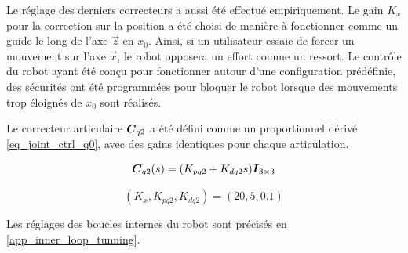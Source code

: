 

Le réglage des derniers correcteurs a aussi été effectué empiriquement. Le gain $K_x$ pour la correction sur la position a été choisi de manière à fonctionner comme un guide le long de l'axe $\vec{z}$ en $x_0$. Ainsi, si un utilisateur essaie de forcer un mouvement sur l'axe $\vec{x}$, le robot opposera un effort comme un ressort. Le contrôle du robot ayant été conçu pour fonctionner autour d'une configuration prédéfinie, des sécurités ont été programmées pour bloquer le robot lorsque des mouvements trop éloignés de $x_0$ sont réalisés.

Le correcteur articulaire $\matr{C}_{q2}$ a été défini comme un proportionnel dérivé \cref{eq_joint_ctrl_q0}, avec des gains identiques pour chaque articulation.

\begin{equation} \label{eq_joint_ctrl_q0}
	\matr{C}_{q2}(s) = (K_{pq2} + K_{dq2} s) \matr{I}_{3\times3}
\end{equation}

\begin{equation}
	(K_x, K_{pq2}, K_{dq2}) = (20, 5, 0.1)
\end{equation}

Les réglages des boucles internes du robot sont précisés en \cref{app_inner_loop_tunning}.


